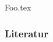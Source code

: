 \documentclass[aspectratio=\BeamerAspectRatio]{beamer}
\begin{document}
\maketitlepage %
\makesectionpopup %

{Foo.tex}

\begin{frame}[allowframebreaks]
    \frametitle{Literatur}
    \printbibliography
\end{frame}
\end{document}

